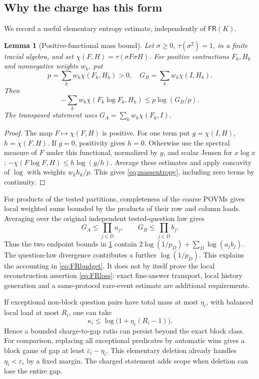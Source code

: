 \documentclass[11pt,reqno]{amsart}
\numberwithin{equation}{section}
\newtheorem{lemma}[theorem]{Lemma}
\theoremstyle{definition}
\theoremstyle{remark}
\newcommand{\eps}{\varepsilon}
\newcommand{\FR}{\mathsf{FR}}
\begin{document}
\subsection{Why the charge has this form}
We record a useful elementary entropy estimate, independently of \(\FR(K)\).

\begin{lemma}[Positive-functional mass bound]\label{lem:massentropy}
Let \(\sigma\ge0\), \(\tau(\sigma^2)=1\), in a finite tracial algebra, and set
\(\chi(F,H)=\tau(\sigma F\sigma H)\). For positive contractions \(F_k,H_k\) and nonnegative weights \(w_k\), put
\[
 p=\sum_k w_k\chi(F_k,H_k)>0,\quad
 G_B=\sum_k w_k\chi(I,H_k).
\]
Then
\begin{equation}\label{eq:massentropy}
 -\sum_k w_k\chi(F_k\log F_k,H_k)
 \le p\log(G_B/p).
\end{equation}
The transposed statement uses \(G_A=\sum_kw_k\chi(F_k,I)\).
\end{lemma}
\begin{proof}
The map \(F\mapsto\chi(F,H)\) is positive. For one term put
\(g=\chi(I,H)\), \(h=\chi(F,H)\). If \(g=0\), positivity gives \(h=0\).
Otherwise use the spectral measure of \(F\) under this functional, normalized by \(g\), and scalar Jensen for \(x\log x\):
\(-\chi(F\log F,H)\le h\log(g/h)\).
Average these estimates and apply concavity of \(\log\) with weights \(w_kh_k/p\). This gives \eqref{eq:massentropy}, including zero terms by continuity.
\end{proof}

For products of the tested partitions, completeness of the coarse POVMs gives local weighted sums bounded by the products of their row and column loads. Averaging over the original independent tested-question law gives
\[
 G_A\le\prod_{j\in D}a_j,\qquad
 G_B\le\prod_{j\in D}b_j.
\]
Thus the two endpoint bounds in \cref{lem:massentropy} contain
\(2\log(1/p_D)+\sum_D\log(a_jb_j)\). The question-law divergence contributes a further \(\log(1/p_D)\). This explains the accounting in \eqref{eq:FRbudget}. It does not by itself prove the local reconstruction assertion \eqref{eq:FRloss}: exact fine-answer transport, local history generation and a same-protocol rare-event estimate are additional requirements.

If exceptional non-block question pairs have total mass at most \(\eta_i\), with balanced local load at most \(R_i\), one can take
\[
 \kappa_i\le\log\bigl(1+\eta_i(R_i-1)\bigr).
\]
Hence a bounded charge-to-gap ratio can persist beyond the exact block class. For comparison, replacing all exceptional predicates by automatic wins gives a block game of gap at least \(\eps_i-\eta_i\). This elementary deletion already handles \(\eta_i<\eps_i\) by a fixed margin. The charged statement adds scope when deletion can lose the entire gap.
\end{document}
